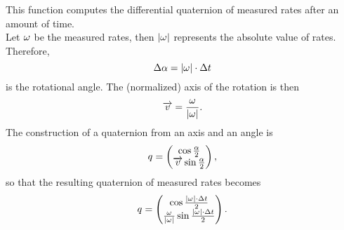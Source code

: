 This function computes the differential quaternion of measured rates after an amount of time. \\
Let $ \omega_{} $ be the measured rates, then $|{\omega_{}}|$ represents the absolute value of rates. Therefore,
\begin{equation}
\Delta \alpha = |{\omega_{}}| \cdot \Delta t
\end{equation}
is the rotational angle. The (normalized) axis of the rotation is then
\begin{equation}
\overrightarrow{v} = \frac{\omega_{}}{|{\omega_{}}|}.
\end{equation}
The construction of a quaternion from an axis and an angle is
\begin{equation}
q_{} = \begin{pmatrix}
\cos \tfrac \alpha 2 \\
\overrightarrow{v} \sin \tfrac \alpha 2
\end{pmatrix},
\end{equation}
so that the resulting quaternion of measured rates becomes
\begin{equation}
q_{} = \begin{pmatrix}
\cos \tfrac{|{\omega_{}}| \cdot \Delta t} 2 \\
 \frac{\omega_{}}{|{\omega_{}}|} \sin \tfrac{|{\omega_{}}| \cdot \Delta t} 2
\end{pmatrix}.
\end{equation}
